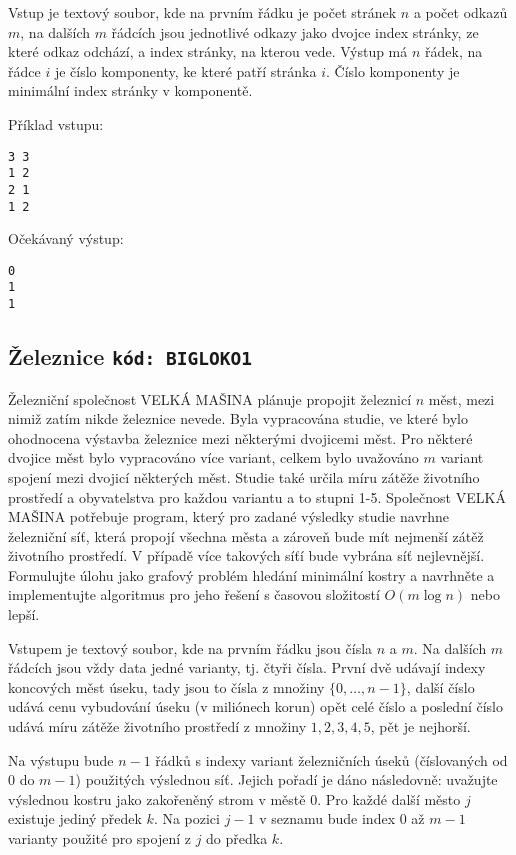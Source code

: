 \documentclass[a4paper,10pt]{article}
\begin{document}
Vstup je textový soubor, kde na prvním řádku je počet stránek $n$ a počet odkazů $m$, na dalších $m$ řádcích jsou jednotlivé odkazy jako dvojce
index stránky, ze které odkaz odchází, a index stránky, na kterou vede.
Výstup má  $n$ řádek, na řádce $i$ je číslo komponenty, ke které patří stránka $i$. Číslo komponenty je minimální index stránky v komponentě.

Příklad vstupu:
\begin{verbatim}
3 3
1 2
2 1
1 2
\end{verbatim}

Očekávaný výstup:
\begin{verbatim}
0
1
1
\end{verbatim}


\subsection{Železnice \hfill{\tt kód: BIGLOKO1}}
Železniční společnost VELKÁ MAŠINA plánuje propojit železnicí $n$ měst, mezi nimiž zatím nikde železnice nevede. Byla vypracována studie, ve které bylo ohodnocena
výstavba železnice mezi některými dvojicemi měst. Pro některé dvojice měst bylo vypracováno více variant, celkem bylo uvažováno 
$m$ variant spojení mezi dvojicí některých měst. 
Studie také určila míru zátěže životního prostředí a obyvatelstva pro každou variantu a to stupni 1-5. 
Společnost VELKÁ MAŠINA potřebuje program, který pro zadané výsledky studie navrhne železniční síť, která propojí všechna města
a zároveň bude mít nejmenší zátěž životního prostředí. V případě více takových síťí bude vybrána síť nejlevnější.
Formulujte úlohu jako grafový problém hledání minimální kostry a navrhněte a implementujte algoritmus pro jeho řešení s časovou složitostí $O(m \log n)$ nebo lepší.

Vstupem je textový soubor, kde na prvním řádku jsou čísla $n$ a $m$. Na dalších $m$ řádcích jsou vždy data jedné varianty, tj. čtyři čísla. 
První dvě udávají indexy koncových měst úseku, tady jsou to čísla z množiny $\{0,\dots,n-1\}$, další číslo udává cenu vybudování úseku (v miliónech korun) 
opět celé číslo a poslední číslo udává míru zátěže životního prostředí z množiny ${1,2,3,4,5}$, pět je nejhorší. 

Na výstupu bude $n-1$ řádků s indexy variant železničních úseků (číslovaných od $0$ do $m-1$) použitých výslednou síť. Jejich pořadí je dáno následovně:
uvažujte výslednou kostru jako zakořeněný strom v městě $0$. Pro každé další město $j$ existuje jediný předek $k$. Na pozici $j-1$ v seznamu bude index $0$ až $m-1$ 
varianty použité pro spojení z $j$ do předka $k$. 
\end{document}
